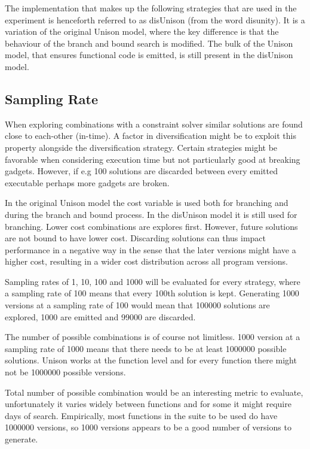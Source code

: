 The implementation that makes up the following strategies that are used in the experiment
is henceforth referred to as disUnison (from the word disunity). It is a variation of the
original Unison model, where the key difference is that the behaviour of the branch and
bound search is modified. The bulk of the Unison model, that ensures functional code is
emitted, is still present in the disUnison model.



\subsection{Sampling Rate}
\label{sec:sampling_rate}

When exploring combinations with a constraint solver similar solutions are found close to
each-other (in-time). A factor in diversification might be to exploit this property
alongside the diversification strategy. Certain strategies might be favorable when
considering execution time but not particularly good at breaking gadgets. However, if
e.g 100 solutions are discarded between every emitted executable perhaps more gadgets are
broken.

In the original Unison model the cost variable is used both for branching and during the
branch and bound process. In the disUnison model it is still used for branching. Lower
cost combinations are explores first. However, future solutions are not bound to have
lower cost. Discarding solutions can thus impact performance in a negative way in the
sense that the later versions might have a higher cost, resulting in a wider cost
distribution across all program versions.

Sampling rates of 1, 10, 100 and 1000 will be evaluated for every strategy, where a
sampling rate of 100 means that every 100th solution is kept. Generating 1000 versions
at a sampling rate of 100 would mean that 100000 solutions are explored, 1000 are emitted
and 99000 are discarded.

The number of possible combinations is of course not limitless. 1000 version at a sampling
rate of 1000 means that there needs to be at least 1000000 possible solutions. Unison works
at the function level and for every function there might not be 1000000 possible versions.

Total number of possible combination would be an interesting metric to evaluate, unfortunately
it varies widely between functions and for some it might require days of search. Empirically,
most functions in the suite to be used do have 1000000 versions, so 1000 versions appears
to be a good number of versions to generate.

